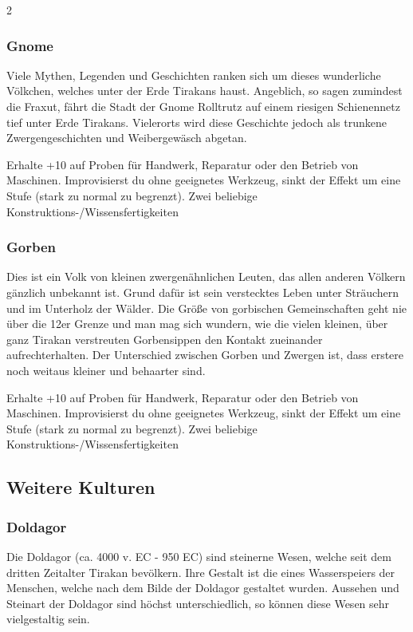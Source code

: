 {\begin{multicols*}{2}
        \subsubsection*{Gnome}
        Viele Mythen, Legenden und Geschichten ranken sich um dieses wunderliche Völkchen, welches unter der Erde Tirakans haust. Angeblich, so sagen zumindest die Fraxut, fährt die Stadt der Gnome Rolltrutz auf einem riesigen Schienennetz tief unter Erde Tirakans. Vielerorts wird diese Geschichte jedoch als trunkene Zwergengeschichten und Weibergewäsch abgetan.

        \abstammungspielwertebox
        {Erhalte +10 auf Proben für Handwerk, Reparatur oder den Betrieb von Maschinen.}
        {Improvisierst du ohne geeignetes Werkzeug, sinkt der Effekt um eine Stufe (stark zu normal zu begrenzt).}
        {Zwei beliebige Konstruktions-/Wissensfertigkeiten}

        \subsubsection*{Gorben}
        Dies ist ein Volk von kleinen zwergenähnlichen Leuten, das allen anderen Völkern gänzlich unbekannt ist. Grund dafür ist sein verstecktes Leben unter Sträuchern und im Unterholz der Wälder. Die Größe von gorbischen Gemeinschaften geht nie über die 12er Grenze und man mag sich wundern, wie die vielen kleinen, über ganz Tirakan verstreuten Gorbensippen den Kontakt zueinander aufrechterhalten. Der Unterschied zwischen Gorben und Zwergen ist, dass erstere noch weitaus kleiner und behaarter sind.

        \abstammungspielwertebox
        {Erhalte +10 auf Proben für Handwerk, Reparatur oder den Betrieb von Maschinen.}
        {Improvisierst du ohne geeignetes Werkzeug, sinkt der Effekt um eine Stufe (stark zu normal zu begrenzt).}
        {Zwei beliebige Konstruktions-/Wissensfertigkeiten}

        \subsection{Weitere Kulturen}\label{subsec:abstammungen-weitere}

        \subsubsection*{Doldagor}
        Die Doldagor (ca. 4000 v. EC - 950 EC) sind steinerne Wesen, welche seit dem dritten Zeitalter Tirakan bevölkern. Ihre Gestalt ist die eines Wasserspeiers der Menschen, welche nach dem Bilde der Doldagor gestaltet wurden. Aussehen und Steinart der Doldagor sind höchst unterschiedlich, so können diese Wesen sehr vielgestaltig sein.


\end{multicols*}}
